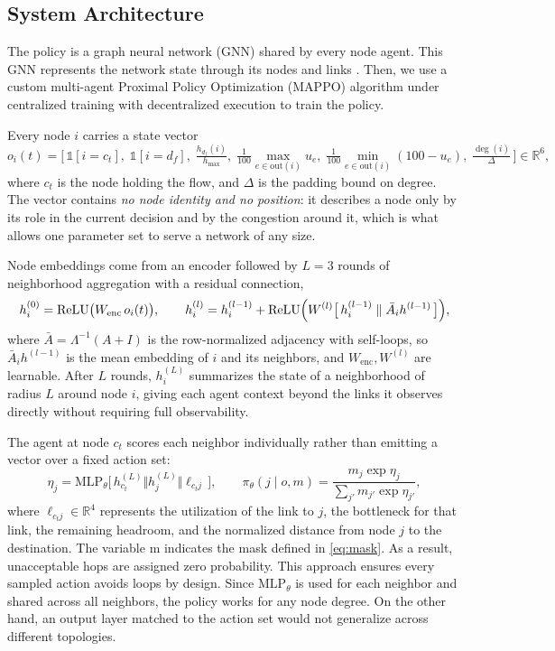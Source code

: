 \subsection{System Architecture}
The policy is a graph neural network (GNN) shared by every node agent. This GNN represents the network state through its nodes and links \citep{Rusek_2020}. Then, we use a custom multi-agent Proximal Policy Optimization (MAPPO) algorithm \citep{schulman2017ppo, yu2022mappo} under centralized training with decentralized execution \citep{marl-book} to train the policy.

Every node $i$ carries a state vector
\begin{equation}\label{eq:nodefeat}
o_i(t)=\bigl[\,\mathbb{1}[i{=}c_t],\;\mathbb{1}[i{=}d_f],\;
\tfrac{h_{d_f}(i)}{h_{\max}},\;
\tfrac{1}{100}\!\max_{e\in\mathrm{out}(i)}\! u_e,\;
\tfrac{1}{100}\!\min_{e\in\mathrm{out}(i)}\!(100{-}u_e),\;
\tfrac{\deg(i)}{\Delta}\,\bigr]\in\mathbb{R}^{6},
\end{equation}
where $c_t$ is the node holding the flow, and $\Delta$ is the padding bound on degree.
The vector contains \emph{no node identity and no position}: it describes a node
only by its role in the current decision and by the congestion around it, which is
what allows one parameter set to serve a network of any size.

Node embeddings come from an encoder followed by $L=3$ rounds of neighborhood
aggregation with a residual connection,
\begin{equation}\label{eq:gnn}
h^{(0)}_i=\mathrm{ReLU}\bigl(W_{\mathrm{enc}}\,o_i(t)\bigr),
\qquad
h^{(l)}_i=h^{(l-1)}_i+\mathrm{ReLU}\Bigl(W^{(l)}\bigl[\,h^{(l-1)}_i
\;\Vert\;
\bar{A}_i h^{(l-1)}\,\bigr]\Bigr),
\end{equation}
where $\bar{A}=\Lambda^{-1}(A+I)$ is the row-normalized adjacency with self-loops,
so $\bar{A}_i h^{(l-1)}$ is the mean embedding of $i$ and its neighbors, and
$W_{\mathrm{enc}},W^{(l)}$ are learnable. After $L$ rounds, $h^{(L)}_i$ summarizes
the state of a neighborhood of radius $L$ around node $i$, giving each agent context
beyond the links it observes directly without requiring full observability.

The agent at node $c_t$ scores each neighbor individually rather than emitting a
vector over a fixed action set:
\begin{equation}\label{eq:policy}
\eta_j=\mathrm{MLP}_\theta\bigl[\,h^{(L)}_{c_t}\Vert h^{(L)}_{j}\Vert
\ell_{c_tj}\,\bigr],
\qquad
\pi_\theta(j\mid o,m)=\frac{m_j\exp\eta_j}{\sum_{j'}m_{j'}\exp\eta_{j'}},
\end{equation}
where $\ell_{c_tj}\in\mathbb{R}^{4}$ represents the utilization of the link to $j$, the bottleneck for that link, the remaining headroom, and the normalized distance from node $j$ to the destination. The variable m indicates the mask defined in \eqref{eq:mask}. As a result, unacceptable hops are assigned zero probability. This approach ensures every sampled action avoids loops by design. Since $\mathrm{MLP}_\theta$ is used for each neighbor and shared across all neighbors, the policy works for any node degree. On the other hand, an output layer matched to the action set would not generalize across different topologies.

